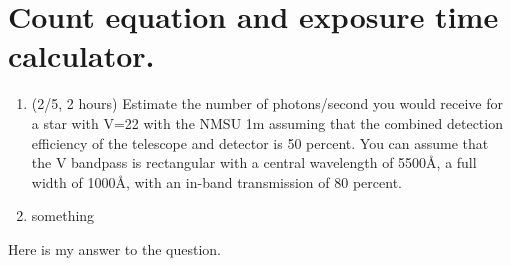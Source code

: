 \documentclass[12pt]{article}
\begin{document}
\section*{\normalsize{Count equation and exposure time calculator.}}

\begin{enumerate}[1.]
    \item (2/5, 2 hours) Estimate the number of photons/second
you would receive for a star with V=22 with the NMSU 1m assuming that
the combined detection efficiency of the telescope and detector is 50
percent. You can assume that the V bandpass is rectangular with a
central wavelength of 5500\AA{}, a full width of 1000\AA{}, with an
in-band transmission of 80 percent.
    \item something
\end{enumerate}

Here is my answer to the question.
\end{document}

